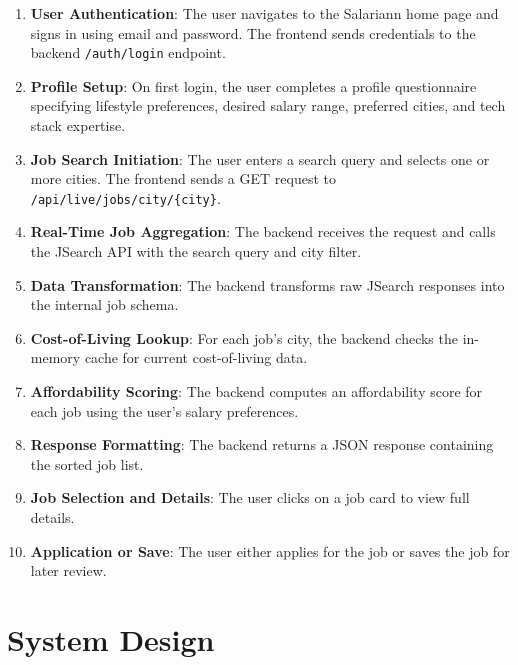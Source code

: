 \documentclass[12pt,a4paper,oneside]{report}
\begin{document}
\begin{enumerate}
    \item \textbf{User Authentication}: The user navigates to the Salariann home page and signs in using email and password. The frontend sends credentials to the backend \texttt{/auth/login} endpoint.
    
    \item \textbf{Profile Setup}: On first login, the user completes a profile questionnaire specifying lifestyle preferences, desired salary range, preferred cities, and tech stack expertise.
    
    \item \textbf{Job Search Initiation}: The user enters a search query and selects one or more cities. The frontend sends a GET request to \texttt{/api/live/jobs/city/\{city\}}.
    
    \item \textbf{Real-Time Job Aggregation}: The backend receives the request and calls the JSearch API with the search query and city filter.
    
    \item \textbf{Data Transformation}: The backend transforms raw JSearch responses into the internal job schema.
    
    \item \textbf{Cost-of-Living Lookup}: For each job's city, the backend checks the in-memory cache for current cost-of-living data.
    
    \item \textbf{Affordability Scoring}: The backend computes an affordability score for each job using the user's salary preferences.
    
    \item \textbf{Response Formatting}: The backend returns a JSON response containing the sorted job list.
    
    \item \textbf{Job Selection and Details}: The user clicks on a job card to view full details.
    
    \item \textbf{Application or Save}: The user either applies for the job or saves the job for later review.
\end{enumerate}

\chapter{System Design}
\end{document}
